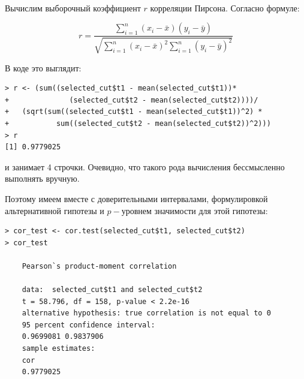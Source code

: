 \documentclass[14pt,a4paper]{scrartcl}
\begin{document}
\begin{figure}[H]
	\begin{minipage}[h]{1\linewidth}
		  \\
	\end{minipage}
\end{figure}

Вычислим выборочный коэффициент $r$ корреляции Пирсона. Согласно формуле:

\begin{equation*}
	r=\frac{\sum_{i=1}^{n}\left(x_{i}-\bar{x}\right)\left(y_{i}-\bar{y}\right)}{\sqrt{\sum_{i=1}^{n}\left(x_{i}-\bar{x}\right)^{2} \sum_{i=1}^{n}\left(y_{i}-\bar{y}\right)^{2}}}
\end{equation*}

В коде это выглядит:

\begin{verbatim}
> r <- (sum((selected_cut$t1 - mean(selected_cut$t1))*
+              (selected_cut$t2 - mean(selected_cut$t2))))/ 
+   (sqrt(sum((selected_cut$t1 - mean(selected_cut$t1))^2) *
+           sum((selected_cut$t2 - mean(selected_cut$t2))^2)))
> r
[1] 0.9779025
\end{verbatim}

и занимает 4 строчки. Очевидно, что такого рода вычисления бессмысленно выполнять вручную. 
\pagebreak

Поэтому имеем вместе с доверительными интервалами, формулировкой альтернативной гипотезы и $p-$уровнем значимости для этой гипотезы:
\begin{verbatim}
> cor_test <- cor.test(selected_cut$t1, selected_cut$t2)
> cor_test

	Pearson`s product-moment correlation
	
	data:  selected_cut$t1 and selected_cut$t2
	t = 58.796, df = 158, p-value < 2.2e-16
	alternative hypothesis: true correlation is not equal to 0
	95 percent confidence interval:
	0.9699081 0.9837906
	sample estimates:
	cor 
	0.9779025
\end{verbatim}
\end{document}
